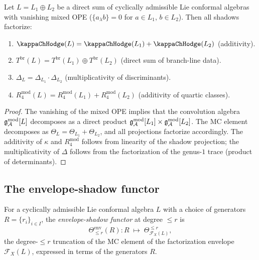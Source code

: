 \begin{proposition}
Let $L = L_1 \oplus L_2$ be a direct sum of cyclically admissible
Lie conformal algebras with vanishing mixed OPE
($\{a_\lambda b\} = 0$ for $a \in L_1$, $b \in L_2$). Then all
shadows factorize:
\begin{enumerate}[label=\textup{(\roman*)}]
\item $\kappaChHodge(L) = \kappaChHodge(L_1) + \kappaChHodge(L_2)$ (additivity).
\item $T^{\mathrm{br}}(L) = T^{\mathrm{br}}(L_1) \oplus
 T^{\mathrm{br}}(L_2)$ (direct sum of branch-line data).
\item $\Delta_L = \Delta_{L_1} \cdot \Delta_{L_2}$ (multiplicativity
 of discriminants).
\item $R_4^{\mathrm{mod}}(L) = R_4^{\mathrm{mod}}(L_1) +
 R_4^{\mathrm{mod}}(L_2)$ (additivity of quartic classes).
\end{enumerate}
\end{proposition}

\begin{proof}
The vanishing of the mixed OPE implies that the convolution algebra
$\mathfrak{g}_{\mathcal{A}}^{\mathrm{mod}}[L]$ decomposes as a direct product
$\mathfrak{g}_{\mathcal{A}}^{\mathrm{mod}}[L_1] \times \mathfrak{g}_{\mathcal{A}}^{\mathrm{mod}}[L_2]$. The MC element decomposes as
$\Theta_L = \Theta_{L_1} + \Theta_{L_2}$, and all projections
factorize accordingly. The additivity of $\kappa$ and $R_4^{\mathrm{mod}}$
follows from linearity of the shadow projection; the multiplicativity
of $\Delta$ follows from the factorization of the genus-$1$ trace
(product of determinants).
\end{proof}


\subsection{The envelope-shadow functor}

\begin{definition}
For a cyclically admissible Lie conformal algebra $L$ with a choice of
generators $R = \{r_i\}_{i \in I}$, the \emph{envelope-shadow functor}
at degree $\le r$ is
\begin{equation}%
\Theta^{\mathrm{env}}_{\le r}(R):
R \;\longmapsto\;
\Theta_{\mathcal{F}_X(L)}^{\le r},
\end{equation}
the degree-$\le r$ truncation of the MC element of the factorization
envelope $\mathcal{F}_X(L)$, expressed in terms of the generators $R$.
\end{definition}

